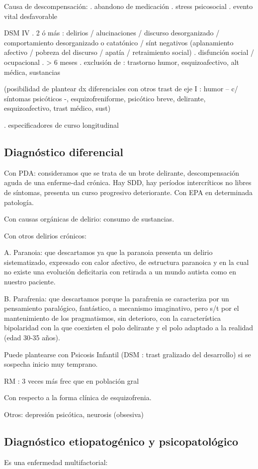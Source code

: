 Causa de descompensación: 
. abandono de medicación
. stress psicosocial
. evento vital desfavorable 

DSM IV
. 2 ó más : delirios / alucinaciones / discurso desorganizado / comportamiento desorganizado o catatónico / sínt negativos (aplanamiento afectivo / pobreza del discurso / apatía / retraimiento social)
. disfunción social / ocupacional
. > 6 meses
. exclusión de : trastorno humor, esquizoafectivo, alt médica, sustancias

(posibilidad de plantear dx diferenciales con otros trast de eje I : humor – c/ síntomas psicóticos -, esquizofreniforme, psicótico breve, delirante, esquizoafectivo, trast médico, sust)

. especificadores de curso longitudinal
\subsection*{Diagnóstico diferencial}
Con PDA: consideramos que se trata de un brote delirante, descompensación aguda de una enferme-dad crónica. Hay SDD, hay períodos intercríticos no libres de síntomas, presenta un curso progresivo deteriorante. Con EPA en determinada patología.

Con causas orgánicas de delirio: consumo de sustancias.

Con otros delirios crónicos:

A. Paranoia: que descartamos ya que la paranoia presenta un delirio sistematizado, expresado con calor afectivo, de estructura paranoica y en la cual no existe una evolución deficitaria con retirada a un mundo autista como en nuestro paciente.

B. Parafrenia: que descartamos porque la parafrenia se caracteriza por un pensamiento paralógico, fantástico, a mecanismo imaginativo, pero s/t por el mantenimiento de los pragmatismos, sin deterioro, con la característica bipolaridad con la que coexisten el polo delirante y el polo adaptado a la realidad (edad 30-35 años).

Puede plantearse con Psicosis Infantil (DSM : trast gralizado del desarrollo) si se sospecha inicio muy temprano.

RM : 3 veces más frec que en población gral

Con respecto a la forma clínica de esquizofrenia.

Otros: depresión psicótica, neurosis (obsesiva)
\subsection*{Diagnóstico etiopatogénico y psicopatológico}
Es una enfermedad multifactorial:

